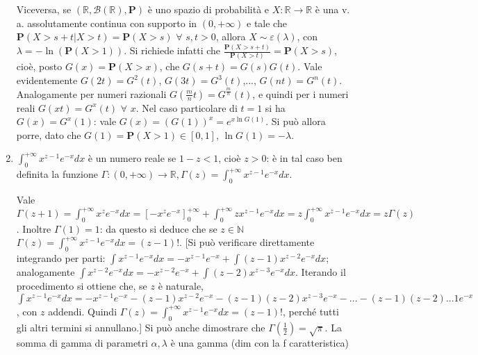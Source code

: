 \documentclass{article}
\begin{document}
\begin{enumerate}
Viceversa, se $\left( 
\mathbb{R}
,\mathcal{B}\left( 
\mathbb{R}
\right) ,\mathbf{P}\right) $ \`{e} uno spazio di probabilit\`{a} e $X:%
\mathbb{R}
\rightarrow 
\mathbb{R}
$ \`{e} una v. a. assolutamente continua con supporto in $\left( 0,+\infty
\right) $ e tale che $\mathbf{P}\left( X>s+t|X>t\right) =\mathbf{P}\left(
X>s\right) $ $\forall $ $s,t>0$, allora $X\sim \varepsilon \left( \lambda
\right) $, con $\lambda =-\ln \left( \mathbf{P}\left( X>1\right) \right) $.
Si richiede infatti che $\frac{\mathbf{P}\left( X>s+t\right) }{\mathbf{P}%
\left( X>t\right) }=\mathbf{P}\left( X>s\right) $, cio\`{e}, posto $G\left(
x\right) =\mathbf{P}\left( X>x\right) $, che $G\left( s+t\right) =G\left(
s\right) G\left( t\right) $. Vale evidentemente $G\left( 2t\right)
=G^{2}\left( t\right) $, $G\left( 3t\right) =G^{3}\left( t\right) $,..., $%
G\left( nt\right) =G^{n}\left( t\right) $. Analogamente per numeri razionali 
$G\left( \frac{m}{n}t\right) =G^{\frac{m}{n}}\left( t\right) $, e
quindi per i numeri reali $G\left( xt\right) =G^{x}\left( t\right) $ $%
\forall $ $x$. Nel caso particolare di $t=1$ si ha $G\left( x\right)
=G^{x}\left( 1\right) $: vale $G\left( x\right) =\left( G\left( 1\right)
\right) ^{x}=e^{x\ln G\left( 1\right) }$. Si pu\`{o} allora porre, dato che $%
G\left( 1\right) =\mathbf{P}\left( X>1\right) \in \left[ 0,1\right] $, $\ln
G\left( 1\right) =-\lambda $.

\item $\int_{0}^{+\infty }x^{z-1}e^{-x}dx$ \`{e} un numero reale se $1-z<1$,
cio\`{e} $z>0$: \`{e} in tal caso ben definita la funzione $\Gamma :\left(
0,+\infty \right) \rightarrow 
\mathbb{R}
,\Gamma \left( z\right) =\int_{0}^{+\infty }x^{z-1}e^{-x}dx$.

Vale $\Gamma \left( z+1\right) =\int_{0}^{+\infty }x^{z}e^{-x}dx=\left[
-x^{z}e^{-x}\right] _{0}^{+\infty }+\int_{0}^{+\infty
}zx^{z-1}e^{-x}dx=z\int_{0}^{+\infty }x^{z-1}e^{-x}dx=z\Gamma \left(
z\right) $. Inoltre $\Gamma \left( 1\right) =1$: da questo si deduce che se $%
z\in 
\mathbb{N}
$ $\Gamma \left( z\right) =\int_{0}^{+\infty }x^{z-1}e^{-x}dx=\left(
z-1\right) !$. [Si pu\`{o} verificare direttamente integrando per parti: $%
\int x^{z-1}e^{-x}dx=-x^{z-1}e^{-x}+\int \left( z-1\right) x^{z-2}e^{-x}dx$;
analogamente $\int x^{z-2}e^{-x}dx=-x^{z-2}e^{-x}+\int \left( z-2\right)
x^{z-3}e^{-x}dx$. Iterando il procedimento si ottiene che, se $z$ \`{e}
naturale, $\int x^{z-1}e^{-x}dx=-x^{z-1}e^{-x}-\left( z-1\right)
x^{z-2}e^{-x}-\left( z-1\right) \left( z-2\right) x^{z-3}e^{-x}-...-\left(
z-1\right) \left( z-2\right) ...1e^{-x}$, con $z$ addendi. Quindi $\Gamma
\left( z\right) =\int_{0}^{+\infty }x^{z-1}e^{-x}dx=\left( z-1\right) !$,
perch\'{e} tutti gli altri termini si annullano.] Si pu\`{o} anche
dimostrare che $\Gamma \left( \frac{1}{2}\right) =\sqrt{\pi }$. La somma
di gamma di parametri $\alpha ,\lambda $ \`{e} una gamma (dim con la f
caratteristica)


\end{enumerate}
\end{document}
